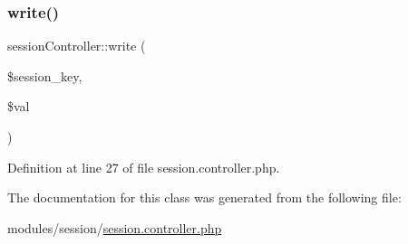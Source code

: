 \hypertarget{classsessionController_a05f09c961d684c81c6b192fff5005407}{}\label{classsessionController_a05f09c961d684c81c6b192fff5005407} 
\subsubsection{\texorpdfstring{write()}{write()}}
{\footnotesize\ttfamily session\+Controller\+::write (\begin{DoxyParamCaption}\item[{}]{\$session\+\_\+key,  }\item[{}]{\$val }\end{DoxyParamCaption})}



Definition at line 27 of file session.\+controller.\+php.



The documentation for this class was generated from the following file\+:\begin{DoxyCompactItemize}
\item 
modules/session/\hyperlink{session_8controller_8php}{session.\+controller.\+php}\end{DoxyCompactItemize}
